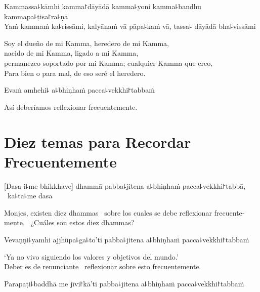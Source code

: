 \clearpage

%
Kammassa꜕kāmhi kamma꜓dāyādā kamma꜕yoni kamma꜕bandhu kammapa꜕ṭisa꜓ra꜕ṇā\\
Yaṁ kammaṁ ka꜕rissāmi, kalyāṇaṁ vā pāpa꜕kaṁ vā, tassa꜕ dāyādā bha꜕vissāmi

\begin{english}
  Soy el dueño de mi Kamma, heredero de mi Kamma, \\
  nacido de mi Kamma, ligado a mi Kamma,\\
  permanezco soportado por mi Kamma; cualquier Kamma que creo, \\
  Para bien o para mal, de eso seré el heredero.
\end{english}

Evaṁ amhehi꜕ a꜕bhiṇhaṁ pacca꜕vekkhi꜓tabbaṁ

\begin{english}
  Así deberíamos reflexionar frecuentemente.
\end{english}

\chapter[Diez temas]{Diez temas para Recordar Frecuentemente}


\begin{leader}
\end{leader}

[Dasa i꜕me bhikkhave] dhammā pabba꜕jitena a꜕bhiṇhaṁ pacca꜕vekkhi꜓tabbā, \pause\ ka꜕ta꜕me dasa

\begin{english}
  Monjes, existen diez dhammas \pause\ sobre los cuales se debe reflexionar frecuentemente. \pause\ ¿Cuáles son estos diez dhammas?
\end{english}

Vevaṇṇi꜕yamhi ajjhūpa꜕ga꜕to'ti pabba꜕jitena a꜕bhiṇhaṁ pacca꜕vekkhi꜓tabbaṁ

\begin{english}
  ‘Ya no vivo siguiendo los valores y objetivos del mundo.’ \pause\\
  Deber es de renunciante \pause\ reflexionar sobre esto frecuentemente.
\end{english}

Parapaṭi꜕baddhā me jīvi꜓kā'ti pabba꜕jitena a꜕bhiṇhaṁ pacca꜕vekkhi꜓tabbaṁ

